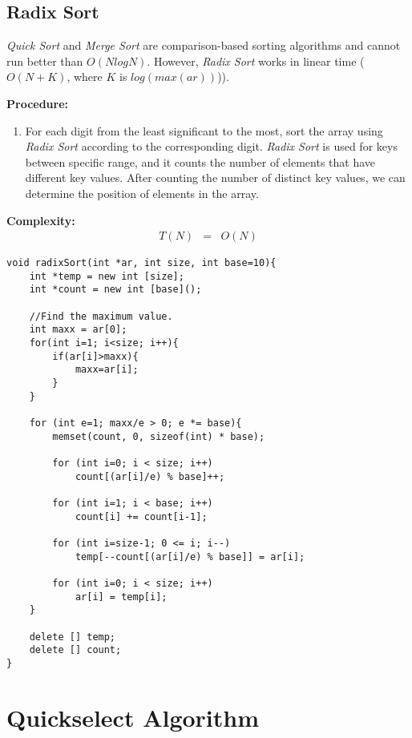 \documentclass[12pt]{article}
\begin{document}
\cleardoublepage
		\subsection{Radix Sort}

	\textit{Quick Sort} and \textit{Merge Sort} are comparison-based sorting algorithms and cannot run better than $O(Nlog N)$. However, \textit{Radix Sort} works in linear time ($O(N + K)$, where $K$ is $log(max(ar))$)).

\textbf{Procedure: }
\begin{enumerate}
	\item For each digit from the least significant to the most, sort the array using \textit{Radix Sort} according to the corresponding digit. \textit{Radix Sort} is used for keys between specific range, and it counts the number of elements that have different key values. After counting the number of distinct key values, we can determine the position of elements in the array. 
\end{enumerate}	

\textbf{Complexity: }
\begin{eqnarray*}
	T(N) &=& O(N)
\end{eqnarray*}

\begin{verbatim}
void radixSort(int *ar, int size, int base=10){
    int *temp = new int [size];
    int *count = new int [base]();

    //Find the maximum value.
    int maxx = ar[0];
    for(int i=1; i<size; i++){
        if(ar[i]>maxx){
            maxx=ar[i];
        }
    }
	
    for (int e=1; maxx/e > 0; e *= base){
        memset(count, 0, sizeof(int) * base);
		
        for (int i=0; i < size; i++)
            count[(ar[i]/e) % base]++;
		
        for (int i=1; i < base; i++)
            count[i] += count[i-1];
		
        for (int i=size-1; 0 <= i; i--)
            temp[--count[(ar[i]/e) % base]] = ar[i];
		
        for (int i=0; i < size; i++)
            ar[i] = temp[i];
    }
	
    delete [] temp;
    delete [] count;
}
\end{verbatim}


\cleardoublepage
    \section{Quickselect Algorithm}
	
\end{document}
